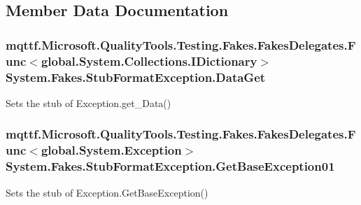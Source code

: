 \subsection{Member Data Documentation}
\hypertarget{class_system_1_1_fakes_1_1_stub_format_exception_a6e3df946fe63e8a48c28122b55412ad9}{
\subsubsection[{Data\-Get}]{\setlength{\rightskip}{0pt plus 5cm}mqttf.\-Microsoft.\-Quality\-Tools.\-Testing.\-Fakes.\-Fakes\-Delegates.\-Func$<$global.\-System.\-Collections.\-I\-Dictionary$>$ System.\-Fakes.\-Stub\-Format\-Exception.\-Data\-Get}}\label{class_system_1_1_fakes_1_1_stub_format_exception_a6e3df946fe63e8a48c28122b55412ad9}


Sets the stub of Exception.\-get\-\_\-\-Data()

\hypertarget{class_system_1_1_fakes_1_1_stub_format_exception_a2d6d664e0f3401fb963a1191d381e2e5}{
\subsubsection[{Get\-Base\-Exception01}]{\setlength{\rightskip}{0pt plus 5cm}mqttf.\-Microsoft.\-Quality\-Tools.\-Testing.\-Fakes.\-Fakes\-Delegates.\-Func$<$global.\-System.\-Exception$>$ System.\-Fakes.\-Stub\-Format\-Exception.\-Get\-Base\-Exception01}}\label{class_system_1_1_fakes_1_1_stub_format_exception_a2d6d664e0f3401fb963a1191d381e2e5}


Sets the stub of Exception.\-Get\-Base\-Exception()

